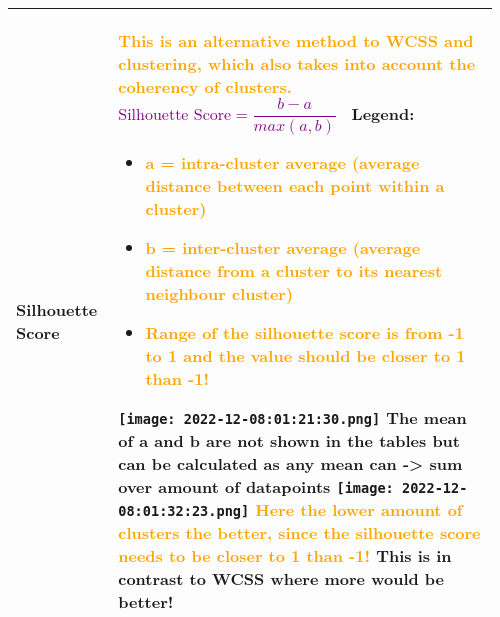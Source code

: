 \documentclass[main.tex,fontsize=8pt,paper=a4,paper=portrait,DIV=calc,]{scrartcl}
\begin{document}
\begin{table}[ht!]
\begin{tabular}{|m{0.2\linewidth}|m{0.755\linewidth}|}
\hline
Silhouette Score & 
\textcolor{orange}{This is an alternative method to WCSS and clustering, which also takes into account the coherency of clusters.}\newline
\, \newline
\large \textcolor{purple}{\( \text{Silhouette Score} = \dfrac{b - a}{max(a,b)}\)}\newline
\normalsize \, \newline
Legend: \newline
\begin{itemize}
\item \textcolor{orange}{a = intra-cluster average (average distance between each point within a cluster)}
\item \textcolor{orange}{b = inter-cluster average (average distance from a cluster to its nearest neighbour cluster)}
\item \textcolor{orange}{Range of the silhouette score is from -1 to 1 and the value should be closer to 1 than -1!}
\end{itemize} 
\texttt{[image: 2022-12-08:01:21:30.png]}\newline
The mean of a and b are not shown in the tables but can be calculated as any mean can -> sum over amount of datapoints\newline
\texttt{[image: 2022-12-08:01:32:23.png]}\newline
\textcolor{orange}{Here the lower amount of clusters the better, since the silhouette score needs to be closer to 1 than -1!}\newline
This is in contrast to WCSS where more would be better!
\\
\hline
\end{tabular}
\end{table}
\end{document}
